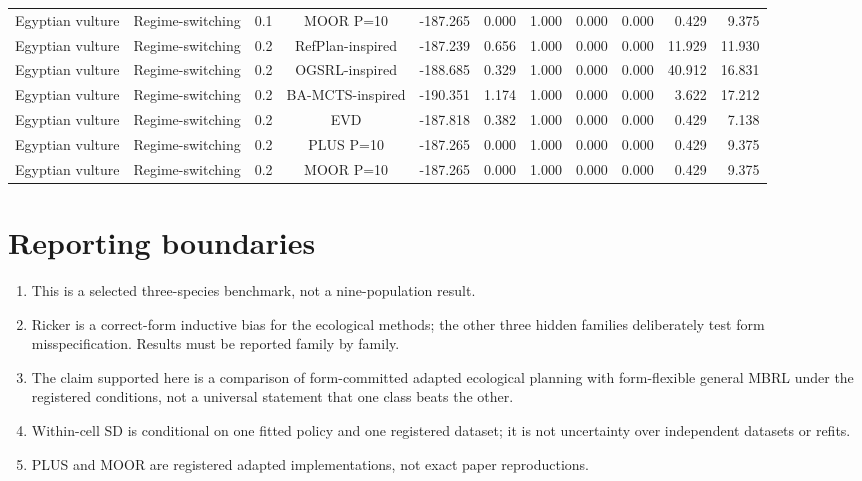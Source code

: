 \documentclass[10pt]{article}
\begin{document}
\begin{landscape}
\begin{center}
\begin{longtable}{@{}lllclrrrrrr@{}}
Egyptian vulture & Regime-switching & 0.1 & MOOR P=10 & -187.265 & 0.000 & 1.000 & 0.000 & 0.000 & 0.429 & 9.375 \\
Egyptian vulture & Regime-switching & 0.2 & RefPlan-inspired & -187.239 & 0.656 & 1.000 & 0.000 & 0.000 & 11.929 & 11.930 \\
Egyptian vulture & Regime-switching & 0.2 & OGSRL-inspired & -188.685 & 0.329 & 1.000 & 0.000 & 0.000 & 40.912 & 16.831 \\
Egyptian vulture & Regime-switching & 0.2 & BA-MCTS-inspired & -190.351 & 1.174 & 1.000 & 0.000 & 0.000 & 3.622 & 17.212 \\
Egyptian vulture & Regime-switching & 0.2 & EVD & -187.818 & 0.382 & 1.000 & 0.000 & 0.000 & 0.429 & 7.138 \\
Egyptian vulture & Regime-switching & 0.2 & PLUS P=10 & -187.265 & 0.000 & 1.000 & 0.000 & 0.000 & 0.429 & 9.375 \\
Egyptian vulture & Regime-switching & 0.2 & MOOR P=10 & -187.265 & 0.000 & 1.000 & 0.000 & 0.000 & 0.429 & 9.375 \\
\end{longtable}
\end{center}
\end{landscape}


\section{Reporting boundaries}
\begin{enumerate}
\item This is a selected three-species benchmark, not a nine-population result.
\item Ricker is a correct-form inductive bias for the ecological methods; the
other three hidden families deliberately test form misspecification.  Results
must be reported family by family.
\item The claim supported here is a comparison of form-committed adapted
ecological planning with form-flexible general MBRL under the registered
conditions, not a universal statement that one class beats the other.
\item Within-cell SD is conditional on one fitted policy and one registered
dataset; it is not uncertainty over independent datasets or refits.
\item PLUS and MOOR are registered adapted implementations, not exact paper
reproductions.
\end{enumerate}
\end{document}
